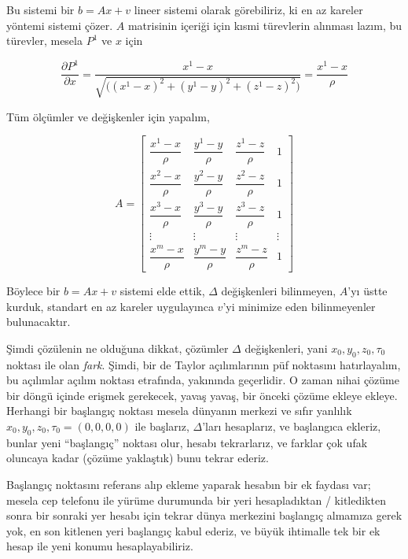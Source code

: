 \documentclass[12pt,fleqn]{article}\usepackage{../../common}
\begin{document}
Bu sistemi bir $b = Ax + v$ lineer sistemi olarak görebiliriz, ki en az
kareler yöntemi sistemi çözer. $A$ matrisinin içeriği için kısmi türevlerin
alınması lazım, bu türevler, mesela $P^1$ ve $x$ için 

$$ 
\frac{\partial P^1}{\partial x} = 
\frac{x^1-x}{\sqrt{ \big( (x^1-x)^2 + (y^1-y)^2 + (z^1-z)^2  \big) }} = \frac{x^1-x}{\rho}
$$

Tüm ölçümler ve değişkenler için yapalım,

$$ 
A = \left[\begin{array}{cccc}
\dfrac{x^1 - x}{\rho} & \dfrac{y^1 - y}{\rho} & \dfrac{z^1 - z}{\rho} & 1 \\
\dfrac{x^2 - x}{\rho} & \dfrac{y^2 - y}{\rho} & \dfrac{z^2 - z}{\rho} & 1 \\
\dfrac{x^3 - x}{\rho} & \dfrac{y^3 - y}{\rho} & \dfrac{z^3 - z}{\rho} & 1 \\
\vdots & \vdots & \vdots & \vdots \\
\dfrac{x^m - x}{\rho} & \dfrac{y^m - y}{\rho} & \dfrac{z^m - z}{\rho} & 1 
\end{array}\right]
$$

Böylece bir $b = Ax + v$ sistemi elde ettik, $\Delta$ değişkenleri
bilinmeyen, $A$'yı üstte kurduk, standart en az kareler uygulayınca $v$'yi
minimize eden bilinmeyenler bulunacaktır.

Şimdi çözülenin ne olduğuna dikkat, çözümler $\Delta$ değişkenleri, yani
$x_0,y_0,z_0,\tau_0$ noktası ile olan {\em fark}. Şimdi, bir de Taylor
açılımlarının püf noktasını hatırlayalım, bu açılımlar açılım noktası
etrafında, yakınında geçerlidir. O zaman nihai çözüme bir döngü içinde
erişmek gerekecek, yavaş yavaş, bir önceki çözüme ekleye ekleye. Herhangi
bir başlangıç noktası mesela dünyanın merkezi ve sıfır yanlılık
$x_0,y_0,z_0,\tau_0 = (0,0,0,0)$ ile başlarız, $\Delta$'ları hesaplarız, ve
başlangıca ekleriz, bunlar yeni ``başlangıç'' noktası olur, hesabı
tekrarlarız, ve farklar çok ufak oluncaya kadar (çözüme yaklaştık) bunu
tekrar ederiz.

Başlangıç noktasını referans alıp ekleme yaparak hesabın bir ek faydası
var; mesela cep telefonu ile yürüme durumunda bir yeri hesapladıktan /
kitledikten sonra bir sonraki yer hesabı için tekrar dünya merkezini
başlangıç almamıza gerek yok, en son kitlenen yeri başlangıç kabul ederiz,
ve büyük ihtimalle tek bir ek hesap ile yeni konumu hesaplayabiliriz.
\end{document}
